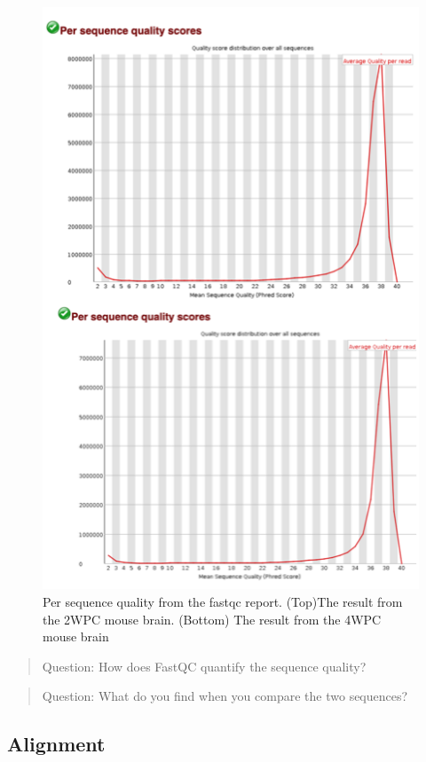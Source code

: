 \documentclass[
]{book}
\begin{document}
\begin{figure}
\centering
\includegraphics{figures/per_sequence_quality.png}
\caption{Per sequence quality from the fastqc report. (Top)The result from the 2WPC mouse brain. (Bottom) The result from the 4WPC mouse brain}
\end{figure}

\begin{quote}
Question: How does FastQC quantify the sequence quality?
\end{quote}

\begin{quote}
Question: What do you find when you compare the two sequences?
\end{quote}

\hypertarget{alignment}{%
\subsection{Alignment}\label{alignment}}
\end{document}
